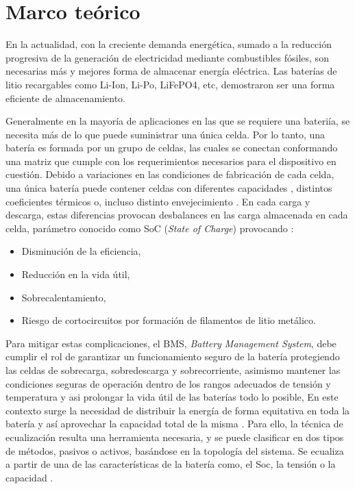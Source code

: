 \section{Marco teórico}

En la actualidad, con la creciente demanda energética, sumado a la reducción progresiva de la generación de electricidad mediante combustibles fósiles, son necesarias más y mejores forma de almacenar energía eléctrica. Las baterías de litio recargables como  Li-Ion, Li-Po, LiFePO4, etc,  demostraron ser una forma eficiente de almacenamiento.

Generalmente en la mayoría de aplicaciones en las que se requiere una bateriía, se necesita más de lo que puede suministrar una única celda. Por lo tanto, una batería es formada por un grupo de celdas, las cuales se conectan conformando una matriz que cumple con los requerimientos necesarios para el dispositivo en cuestión. Debido a variaciones en las condiciones de fabricación de cada celda, una única batería puede contener celdas con diferentes capacidades \cite{chen2015system}, distintos coeficientes térmicos o, incluso distinto envejecimiento . En cada carga y descarga, estas diferencias provocan desbalances en las carga almacenada en cada celda, parámetro conocido como SoC (\textit{State of Charge}) provocando \cite{rumpf2018influence}:

\begin{itemize}
    \item Disminución de la eficiencia,
    \item Reducción en la vida útil,
    \item Sobrecalentamiento,
    \item Riesgo de cortocircuitos por formación de filamentos de litio metálico.
\end{itemize}



Para mitigar estas complicaciones, el BMS, \textit{Battery Management System}\cite{quinones2019estudio}, debe cumplir el rol de garantizar un funcionamiento seguro de la batería protegiendo las celdas de sobrecarga, sobredescarga y sobrecorriente, asimismo mantener las condiciones seguras de operación dentro de los rangos adecuados de tensión y  temperatura y asi  prolongar la vida útil de las baterías todo lo posible,  En este contexto surge la necesidad de distribuir la energía de forma equitativa en toda la batería y así aprovechar la capacidad total de la misma \cite{lu2013review}. Para ello, la técnica de ecualización resulta una herramienta necesaria, y se puede clasificar en dos tipos de métodos, pasivos o activos, basándose en la topología del sistema. Se ecualiza a partir de una de las características de la batería como, el Soc, la tensión o la capacidad \cite{hua2020comprehensive}.

